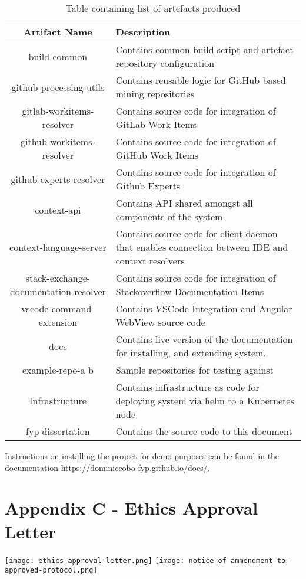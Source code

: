 \begin{table}[h!]
\centering
\begin{tabular}{|c|p{8cm}|}
	\hline 
	Artifact Name & Description \\ 
	\hline 
	build-common & Contains common build script and artefact repository configuration \\ 
	\hline 
	github-processing-utils & Contains reusable logic for GitHub based mining repositories \\ 
	\hline 
	gitlab-workitems-resolver & Contains source code for integration of GitLab Work Items  \\ 
	\hline 
	github-workitems-resolver & Contains source code for integration of GitHub Work Items \\ 
	\hline 
	github-experts-resolver & Contains source code for integration of Github Experts \\ 
	\hline 
	context-api & Contains API shared amongst all components of the system \\ 
	\hline 
	context-language-server & Contains source code for client daemon that enables connection between IDE and context resolvers \\ 
	\hline 
	stack-exchange-documentation-resolver & Contains source code for integration of Stackoverflow Documentation Items \\ 
	\hline 
	vscode-command-extension & Contains VSCode Integration and Angular WebView source code \\ 
	\hline 
	docs & Contains live version of the documentation for installing, and extending system. \\ 
	\hline 
	example-repo-a b & Sample repositories for testing against \\ 
	\hline 
	Infrastructure & Contains infrastructure as code for deploying system via helm to a Kubernetes node \\ 
	\hline 
	fyp-dissertation & Contains the source code to this document \\ 
	\hline 
\end{tabular} 
\caption{Table containing list of artefacts produced}
\label{table:artefactsInProject}
\end{table}

Instructions on installing the project for demo purposes can be found in the documentation \url{https://dominiccobo-fyp.github.io/docs/}.

\section{Appendix C - Ethics Approval Letter}

\texttt{[image: ethics-approval-letter.png]}
\newpage
\texttt{[image: notice-of-ammendment-to-approved-protocol.png]}